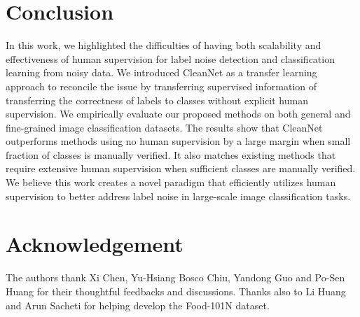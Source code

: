 \documentclass[10pt,twocolumn,letterpaper]{article}
\begin{document}
\section{Conclusion}
In this work, we highlighted the difficulties of having both scalability and effectiveness of human supervision for label noise detection and classification learning from noisy data. We introduced CleanNet as a transfer learning approach to reconcile the issue by transferring supervised information of transferring the correctness of labels to classes without explicit human supervision. We empirically evaluate our proposed methods on both general and fine-grained image classification datasets. The results show that CleanNet outperforms methods using no human supervision by a large margin when small fraction of classes is manually verified. It also matches existing methods that require extensive human supervision when sufficient classes are manually verified. We believe this work creates a novel paradigm that efficiently utilizes human supervision to better address label noise in large-scale image classification tasks.

\section*{Acknowledgement} The authors thank Xi Chen, Yu-Hsiang Bosco Chiu, Yandong Guo and Po-Sen Huang for their thoughtful feedbacks and discussions. Thanks also to Li Huang and Arun Sacheti for helping develop the Food-101N dataset. 

{\small


}
\end{document}
